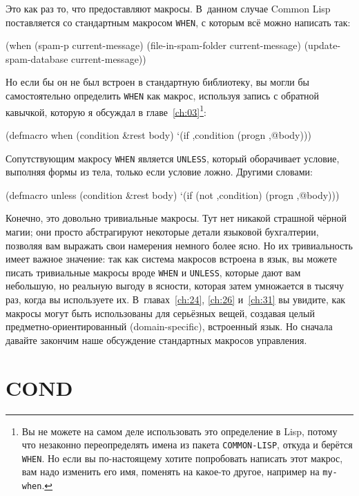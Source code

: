 Это как раз то, что предоставляют макросы. В~данном случае Common Lisp поставляется со
стандартным макросом \lstinline{WHEN}, с которым всё можно написать так:

\begin{myverb}
(when (spam-p current-message)
  (file-in-spam-folder current-message)
  (update-spam-database current-message))
\end{myverb}

Но если бы он не был встроен в стандартную библиотеку, вы могли бы самостоятельно
определить \lstinline{WHEN} как макрос, используя запись с обратной кавычкой, которую я
обсуждал в главе~\ref{ch:03}\footnote{Вы не можете на самом деле использовать это определение в
  Lisp, потому что незаконно переопределять имена из пакета \lstinline{COMMON-LISP}, откуда и
  берётся \lstinline{WHEN}. Но если вы по-настоящему хотите попробовать написать этот макрос,
  вам надо изменить его имя, поменять на какое-то другое, например на \lstinline{my-when}.}:

\begin{myverb}
(defmacro when (condition &rest body)
  `(if ,condition (progn ,@body)))
\end{myverb}

Сопутствующим макросу \lstinline{WHEN} является \lstinline{UNLESS}, который оборачивает условие,
выполняя формы из тела, только если условие ложно. Другими словами:

\begin{myverb}
(defmacro unless (condition &rest body)
  `(if (not ,condition) (progn ,@body)))
\end{myverb}

Конечно, это довольно тривиальные макросы. Тут нет никакой страшной чёрной магии; они
просто абстрагируют некоторые детали языковой бухгалтерии, позволяя вам выражать свои
намерения немного более ясно. Но их тривиальность имеет важное значение: так как система
макросов встроена в язык, вы можете писать тривиальные макросы вроде \lstinline{WHEN} и
\lstinline{UNLESS}, которые дают вам небольшую, но реальную выгоду в ясности, которая затем
умножается в тысячу раз, когда вы используете их. В~главах~\ref{ch:24}, \ref{ch:26}
и~\ref{ch:31} вы увидите, как макросы могут быть использованы для серьёзных вещей,
создавая целый предметно-ориентированный (domain-specific), встроенный язык. Но сначала
давайте закончим наше обсуждение стандартных макросов управления.

\section{COND}

